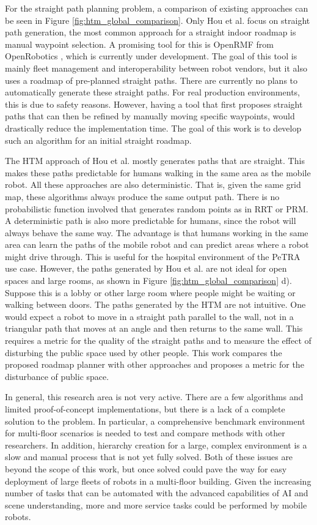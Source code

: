 For the straight path planning problem, a comparison of existing approaches can be seen in Figure \ref{fig:htm_global_comparison}. Only Hou et al. focus on straight path generation, the most common approach for a straight indoor roadmap is manual waypoint selection. A promising tool for this is OpenRMF from OpenRobotics \cite{openrobotics_open-rmf_2023}, which is currently under development. The goal of this tool is mainly fleet management and interoperability between robot vendors, but it also uses a roadmap of pre-planned straight paths. There are currently no plans to automatically generate these straight paths. For real production environments, this is due to safety reasons. However, having a tool that first proposes straight paths that can then be refined by manually moving specific waypoints, would drastically reduce the implementation time. The goal of this work is to develop such an algorithm for an initial straight roadmap.

The HTM approach of Hou et al. mostly generates paths that are straight. This makes these paths predictable for humans walking in the same area as the mobile robot. All these approaches are also deterministic. That is, given the same grid map, these algorithms always produce the same output path. There is no probabilistic function involved that generates random points as in RRT or PRM. A deterministic path is also more predictable for humans, since the robot will always behave the same way. The advantage is that humans working in the same area can learn the paths of the mobile robot and can predict areas where a robot might drive through. This is useful for the hospital environment of the PeTRA use case. However, the paths generated by Hou et al. are not ideal for open spaces and large rooms, as shown in Figure \ref{fig:htm_global_comparison} d). Suppose this is a lobby or other large room where people might be waiting or walking between doors. The paths generated by the HTM are not intuitive. One would expect a robot to move in a straight path parallel to the wall, not in a triangular path that moves at an angle and then returns to the same wall. This requires a metric for the quality of the straight paths and to measure the effect of disturbing the public space used by other people. This work compares the proposed roadmap planner with other approaches and proposes a metric for the disturbance of public space.

In general, this research area is not very active. There are a few algorithms and limited proof-of-concept implementations, but there is a lack of a complete solution to the problem. In particular, a comprehensive benchmark environment for multi-floor scenarios is needed to test and compare methods with other researchers. In addition, hierarchy creation for a large, complex environment is a slow and manual process that is not yet fully solved. Both of these issues are beyond the scope of this work, but once solved could pave the way for easy deployment of large fleets of robots in a multi-floor building. Given the increasing number of tasks that can be automated with the advanced capabilities of AI and scene understanding, more and more service tasks could be performed by mobile robots.